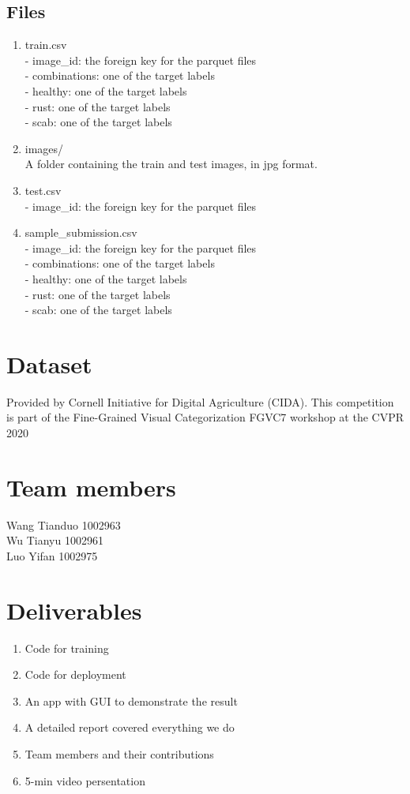 \documentclass{article}
\begin{document}
\subsection*{Files}

\begin{enumerate}
    \item train.csv \\
- image\_id: the foreign key for the parquet files\\
- combinations: one of the target labels\\
- healthy: one of the target labels\\
- rust: one of the target labels\\
- scab: one of the target labels
    \item images/\\
A folder containing the train and test images, in jpg format.
    \item test.csv\\
- image\_id: the foreign key for the parquet files
    \item sample\_submission.csv\\
- image\_id: the foreign key for the parquet files\\
- combinations: one of the target labels\\
- healthy: one of the target labels\\
- rust: one of the target labels\\
- scab: one of the target labels
\end{enumerate}

\section{Dataset}
Provided by Cornell Initiative for Digital Agriculture (CIDA). This competition is part of the Fine-Grained Visual Categorization FGVC7 workshop at the CVPR 2020

\section{Team members}
Wang Tianduo 1002963 \\
Wu Tianyu 1002961 \\
Luo Yifan 1002975 \\ 

\section{Deliverables}
\begin{enumerate}
    \item Code for training
    \item Code for deployment
    \item An app with GUI to demonstrate the result
    \item A detailed report covered everything we do
    \item Team members and their contributions
    \item 5-min video persentation
\end{enumerate}
\end{document}
